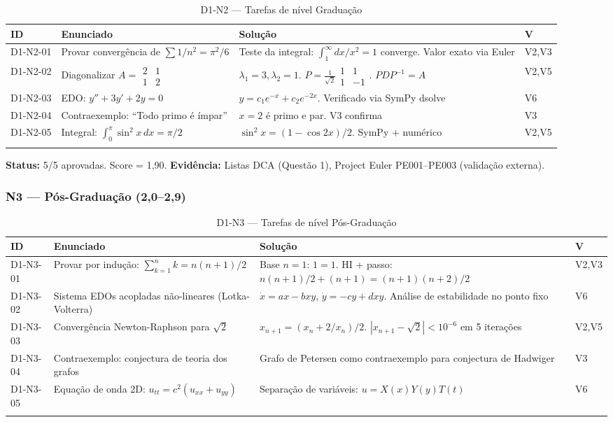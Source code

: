 \documentclass[12pt,a4paper,oneside]{article}
\begin{document}
\begin{longtable}{p{}p{}p{}p{}}
\toprule
\textbf{ID} & \textbf{Enunciado} & \textbf{Solução} & \textbf{V} \\
\midrule
D1-N2-01 & Provar convergência de $\sum 1/n^2 = \pi^2/6$ & Teste da integral: $\int_1^\infty dx/x^2=1$ converge. Valor exato via Euler & V2,V3 \\
D1-N2-02 & Diagonalizar $A=\begin{smallmatrix}2&1\\1&2\end{smallmatrix}$ & $\lambda_1=3,\lambda_2=1$. $P=\frac{1}{\sqrt{2}}\begin{smallmatrix}1&1\\1&-1\end{smallmatrix}$. $PDP^{-1}=A$ & V2,V5 \\
D1-N2-03 & EDO: $y''+3y'+2y=0$ & $y=c_1e^{-x}+c_2e^{-2x}$. Verificado via SymPy dsolve & V6 \\
D1-N2-04 & Contraexemplo: ``Todo primo é ímpar'' & $x=2$ é primo e par. V3 confirma & V3 \\
D1-N2-05 & Integral: $\int_0^\pi \sin^2x\,dx=\pi/2$ & $\sin^2x=(1-\cos 2x)/2$. SymPy + numérico & V2,V5 \\
\bottomrule
\caption{D1-N2 — Tarefas de nível Graduação}
\end{longtable}

\textbf{Status:} 5/5 aprovadas. Score = 1,90. \textbf{Evidência:} Listas DCA
(Questão 1), Project Euler PE001--PE003 (validação externa).

\subsubsection{N3 — Pós-Graduação (2,0--2,9)}

\begin{longtable}{p{}p{}p{}p{}}
\toprule
\textbf{ID} & \textbf{Enunciado} & \textbf{Solução} & \textbf{V} \\
\midrule
D1-N3-01 & Provar por indução: $\sum_{k=1}^n k = n(n+1)/2$ & Base $n=1$: $1=1$. HI + passo: $n(n+1)/2+(n+1)=(n+1)(n+2)/2$ & V2,V3 \\
D1-N3-02 & Sistema EDOs acopladas não-lineares (Lotka-Volterra) & $\dot{x}=ax-bxy$, $\dot{y}=-cy+dxy$. Análise de estabilidade no ponto fixo & V6 \\
D1-N3-03 & Convergência Newton-Raphson para $\sqrt{2}$ & $x_{n+1}=(x_n+2/x_n)/2$. $|x_{n+1}-\sqrt{2}|<10^{-6}$ em 5 iterações & V2,V5 \\
D1-N3-04 & Contraexemplo: conjectura de teoria dos grafos & Grafo de Petersen como contraexemplo para conjectura de Hadwiger & V3 \\
D1-N3-05 & Equação de onda 2D: $u_{tt}=c^2(u_{xx}+u_{yy})$ & Separação de variáveis: $u=X(x)Y(y)T(t)$ & V6 \\
\bottomrule
\caption{D1-N3 — Tarefas de nível Pós-Graduação}
\end{longtable}
\end{document}
